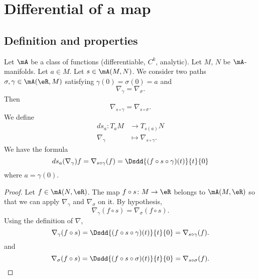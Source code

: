 \section{Differential of a map}

\subsection{Definition and properties}


\begin{propositionDef}      \label{DEFooDRGUooDPFIJa}
	Let \( \mA\) be a class of functions (differentiable, \( C^k\), analytic). Let \( M\), \( N\) be \( \mA\)-manifolds. Let \( a\in M\). Let \( s\in\mA(M,N)\). We consider two paths \(\sigma,\gamma \in\mA(\eR,M)  \) satisfying \( \gamma(0)=\sigma(0)=a\) and
	\begin{equation}
		\nabla_{\gamma}=\nabla_{\sigma}.
	\end{equation}
	Then
	\begin{equation}
		\nabla_{s\circ \gamma}=\nabla_{s\circ \sigma}.
	\end{equation}
	We define
	\begin{equation}        \label{EQooQNZPooMVaSQC}
		\begin{aligned}
			ds_a\colon T_aM & \to T_{s(a)}N                   \\
			\nabla_{\gamma} & \mapsto \nabla_{s\circ \gamma}.
		\end{aligned}
	\end{equation}
	We have the formula
	\begin{equation}        \label{EQooEWMRooFsSVpb}
		ds_a(\nabla_{\gamma})f=\nabla_{s\circ \gamma}(f)=\Dsdd{ (f\circ s\circ\gamma)(t) }{t}{0}
	\end{equation}
	where \( a=\gamma(0)\).
\end{propositionDef}

\begin{proof}
	Let \( f\in\mA(N,\eR)\). The map \( f\circ s\colon M\to \eR\) belongs to \( \mA(M,\eR)\) so that we can apply \( \nabla_{\gamma}\) and \( \nabla_{\sigma}\) on it. By hypothesis,
	\begin{equation}
		\nabla_{\gamma}(f\circ s)=\nabla_{\sigma}(f\circ s).
	\end{equation}
	Using the definition of \( \nabla\),
	\begin{equation}
		\nabla_{\gamma}(f\circ s)=\Dsdd{ (f\circ s\circ \gamma)(t) }{t}{0}=\nabla_{s\circ\gamma}(f).
	\end{equation}
	and
	\begin{equation}
		\nabla_{\sigma}(f\circ s)=\Dsdd{ (f\circ s\circ \sigma)(t) }{t}{0}=\nabla_{s\circ\sigma}(f).
	\end{equation}
\end{proof}

